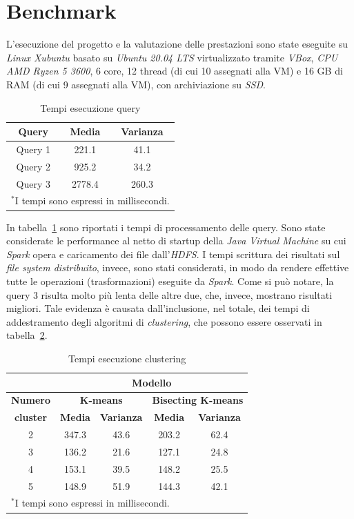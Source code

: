 \documentclass[conference]{IEEEtran}
\begin{document}
\section{\textbf{Benchmark}}
L'esecuzione del progetto e la valutazione delle prestazioni sono state eseguite su \emph{Linux Xubuntu} basato su \emph{Ubuntu 20.04 LTS} virtualizzato tramite \emph{VBox}, \emph{CPU AMD Ryzen 5 3600}, 6 core, 12 thread (di cui 10 assegnati alla VM) e 16 GB di RAM (di cui 9 assegnati alla VM), con archiviazione su \emph{SSD}. \\
\begin{table}[htbp]
\caption{Tempi esecuzione query}
\begin{center}
    \begin{tabular}{|c|c|c|}
    \hline
    \textbf{Query} & \textbf{Media} & \textbf{Varianza}  \\ \hline
    Query 1 & 221.1 & 41.1  \\ \hline
    Query 2 & 925.2 & 34.2 \\ \hline
    Query 3 & 2778.4 & 260.3 \\ \hline
    \multicolumn{3}{l}{$^{\mathrm{*}}$I tempi sono espressi in millisecondi.}
    \end{tabular}
\label{tab1}
\end{center}
\end{table}
\par In tabella~\ref{tab1} sono riportati i tempi di processamento delle query. Sono state considerate le performance al netto di startup della \emph{Java Virtual Machine} su cui \emph{Spark} opera e caricamento dei file dall'\emph{HDFS}. I tempi scrittura dei risultati sul \emph{file system distribuito}, invece, sono stati considerati, in modo da rendere effettive tutte le operazioni (trasformazioni) eseguite da \emph{Spark}. Come si pu\`{o} notare, la query 3 risulta molto pi\`{u} lenta delle altre due, che, invece, mostrano risultati migliori. Tale evidenza \`{e} causata dall'inclusione, nel totale, dei tempi di addestramento degli algoritmi di \emph{clustering}, che possono essere osservati in tabella~\ref{tab2}.
\begin{table}[htbp]
\caption{Tempi esecuzione clustering}
\begin{center}
\begin{tabular}{|c|c|c|c|c|}
\hline
\textbf{}&\multicolumn{4}{|c|}{\textbf{Modello}} \\ \hline
\textbf{Numero} & \multicolumn{2}{|c|}{\textbf{K-means}} & \multicolumn{2}{|c|}{\textbf{Bisecting K-means}} \\ \cline{2-5} 
\textbf{cluster} & \textbf{Media} & \textbf{Varianza} & \textbf{Media} & \textbf{Varianza} \\ \hline
2 & 347.3 & 43.6 & 203.2 & 62.4 \\ \hline
3 & 136.2 & 21.6 & 127.1 & 24.8 \\ \hline
4 & 153.1 & 39.5 & 148.2 & 25.5 \\ \hline
5 & 148.9 & 51.9 & 144.3 & 42.1 \\ \hline
\multicolumn{5}{l}{$^{\mathrm{*}}$I tempi sono espressi in millisecondi.}
\end{tabular}
\label{tab2}
\end{center}
\end{table}
\end{document}
